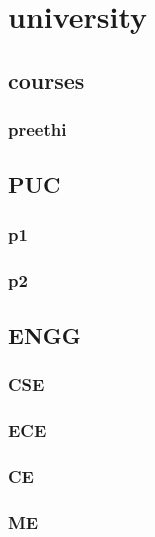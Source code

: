 \documentclass{article}
\begin{document}
\tableofcontents
\newpage
\section{university}
\subsection{courses}
\subsubsection{preethi}
\subsection{PUC}
\subsubsection{p1}
\subsubsection{p2}
\subsection{ENGG}
\subsubsection{CSE}
\subsubsection{ECE}
\subsubsection{CE}
\subsubsection{ME}
\end{document}

